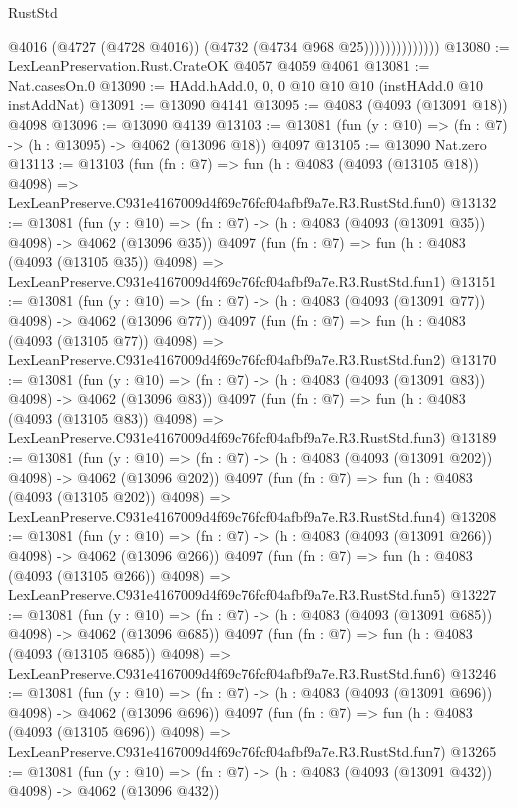 \begin{lexlean}{RustStd}
\begin{coremodule}
                            @4016
                            (@4727 (@4728 @4016))
                            (@4732 (@4734 @968 @25))))))))))))))
@13080 := LexLeanPreservation.Rust.CrateOK @4057 @4059 @4061
@13081 := Nat.casesOn.{0}
@13090 := HAdd.hAdd.{0, 0, 0} @10 @10 @10 (instHAdd.{0} @10 instAddNat)
@13091 := @13090 @4141
@13095 := @4083 (@4093 (@13091 @18)) @4098
@13096 := @13090 @4139
@13103 := @13081 (fun (y : @10) => (fn : @7) -> (h : @13095) -> @4062 (@13096 @18)) @4097
@13105 := @13090 Nat.zero
@13113 := @13103
    (fun (fn : @7) =>
    fun (h : @4083 (@4093 (@13105 @18)) @4098) =>
    LexLeanPreserve.C931e4167009d4f69c76fcf04afbf9a7e.R3.RustStd.fun0)
@13132 := @13081
    (fun (y : @10) => (fn : @7) -> (h : @4083 (@4093 (@13091 @35)) @4098) -> @4062 (@13096 @35))
    @4097
    (fun (fn : @7) =>
    fun (h : @4083 (@4093 (@13105 @35)) @4098) =>
    LexLeanPreserve.C931e4167009d4f69c76fcf04afbf9a7e.R3.RustStd.fun1)
@13151 := @13081
    (fun (y : @10) => (fn : @7) -> (h : @4083 (@4093 (@13091 @77)) @4098) -> @4062 (@13096 @77))
    @4097
    (fun (fn : @7) =>
    fun (h : @4083 (@4093 (@13105 @77)) @4098) =>
    LexLeanPreserve.C931e4167009d4f69c76fcf04afbf9a7e.R3.RustStd.fun2)
@13170 := @13081
    (fun (y : @10) => (fn : @7) -> (h : @4083 (@4093 (@13091 @83)) @4098) -> @4062 (@13096 @83))
    @4097
    (fun (fn : @7) =>
    fun (h : @4083 (@4093 (@13105 @83)) @4098) =>
    LexLeanPreserve.C931e4167009d4f69c76fcf04afbf9a7e.R3.RustStd.fun3)
@13189 := @13081
    (fun (y : @10) => (fn : @7) -> (h : @4083 (@4093 (@13091 @202)) @4098) -> @4062 (@13096 @202))
    @4097
    (fun (fn : @7) =>
    fun (h : @4083 (@4093 (@13105 @202)) @4098) =>
    LexLeanPreserve.C931e4167009d4f69c76fcf04afbf9a7e.R3.RustStd.fun4)
@13208 := @13081
    (fun (y : @10) => (fn : @7) -> (h : @4083 (@4093 (@13091 @266)) @4098) -> @4062 (@13096 @266))
    @4097
    (fun (fn : @7) =>
    fun (h : @4083 (@4093 (@13105 @266)) @4098) =>
    LexLeanPreserve.C931e4167009d4f69c76fcf04afbf9a7e.R3.RustStd.fun5)
@13227 := @13081
    (fun (y : @10) => (fn : @7) -> (h : @4083 (@4093 (@13091 @685)) @4098) -> @4062 (@13096 @685))
    @4097
    (fun (fn : @7) =>
    fun (h : @4083 (@4093 (@13105 @685)) @4098) =>
    LexLeanPreserve.C931e4167009d4f69c76fcf04afbf9a7e.R3.RustStd.fun6)
@13246 := @13081
    (fun (y : @10) => (fn : @7) -> (h : @4083 (@4093 (@13091 @696)) @4098) -> @4062 (@13096 @696))
    @4097
    (fun (fn : @7) =>
    fun (h : @4083 (@4093 (@13105 @696)) @4098) =>
    LexLeanPreserve.C931e4167009d4f69c76fcf04afbf9a7e.R3.RustStd.fun7)
@13265 := @13081
    (fun (y : @10) => (fn : @7) -> (h : @4083 (@4093 (@13091 @432)) @4098) -> @4062 (@13096 @432))

\end{coremodule}
\end{lexlean}
